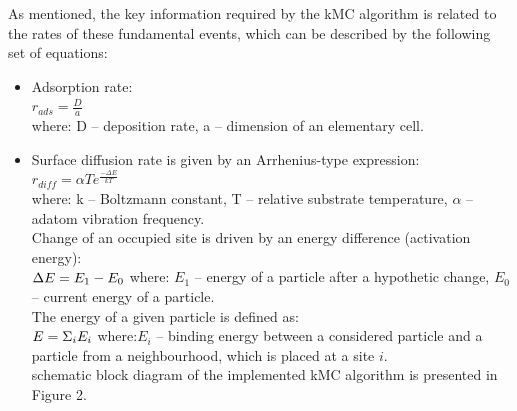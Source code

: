 \documentclass[journal,article,submit,pdftex,moreauthors]{Definitions/mdpi}
\begin{document}
As mentioned, the key information required by the kMC algorithm is related to the rates of these fundamental events, which can be described by the following set of equations:
\begin{itemize}%
   \item Adsorption rate: \\
  \begin{math}
  r_{ads} = \frac{D}{a}
  \end{math}\\
   where: D – deposition rate, a – dimension of an elementary cell.\\
   \item Surface diffusion rate is given by an Arrhenius-type expression:\\
  \begin{math}
  r_{diff} = \alpha Te^\frac{-\Delta E}{kT}
  \end{math}\\
  where: k – Boltzmann constant, T – relative substrate temperature, $ \alpha$ – adatom \noindent vibration frequency.\\
  Change of an occupied site is driven by an energy difference (activation energy):\\
  \begin{math}
  \Delta E = E_1 - E_0\\
  \end{math}
  where: $E_1$ – energy of a particle after a hypothetic change, $E_0$ – current energy of a particle.\\
  The energy of a given particle is defined as:\\
  \begin{math}
  E=\Sigma_{i}E_i\\
  \end{math}
  where:$E_i$ – binding energy between a considered particle and a particle from a neighbourhood, which is placed at a site $i$.\\
   schematic block diagram of the implemented kMC algorithm is presented in Figure 2.
\end{itemize}\
 
\end{document}
